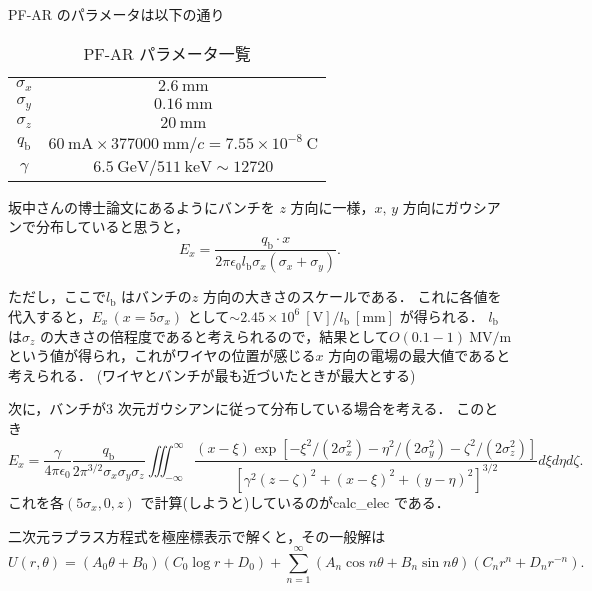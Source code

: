 \documentclass{jsarticle}
\begin{document}
PF-AR のパラメータは以下の通り
\begin{table}[h]
\centering
\caption{PF-AR パラメータ一覧\label{tab:pfarparameter}}
\begin{tabular}{cc} \hline
$\sigma_x$ & $2.6~\mathrm{mm}$ \\ 
$\sigma_y$ & $0.16~\mathrm{mm}$ \\ 
$\sigma_z$ & $20~\mathrm{mm}$ \\ 
$q_\mathrm{b}$ & $60~\mathrm{mA} \times 377000~\mathrm{mm}/c = 7.55 \times 10^{-8}~\mathrm{C}$ \\
$\gamma$ & $6.5~\mathrm{GeV}/511~\mathrm{keV} \sim 12720$ \\ \hline
\end{tabular}
\end{table}

坂中さんの博士論文にあるようにバンチを $z$ 方向に一様，$x,\,y$ 方向にガウシアンで分布していると思うと，
\begin{equation}
E_x = \frac{q_\mathrm{b} \cdot x}{2\pi \epsilon_0 l_\mathrm{b}\sigma_x(\sigma_x + \sigma_y)}.
\end{equation}

ただし，ここで$l_\mathrm{b}$ はバンチの$z$ 方向の大きさのスケールである．
これに各値を代入すると，$E_x\,(x = 5\sigma_x)$ として$\sim 2.45 \times 10^6~[\mathrm{V}] /l_\mathrm{b}~[\mathrm{mm}]$ が得られる．
$l_\mathrm{b}$ は$\sigma_z$ の大きさの倍程度であると考えられるので，結果として$O(0.1-1)~\mathrm{MV/m}$ という値が得られ，これがワイヤの位置が感じる$x$ 方向の電場の最大値であると考えられる．
(ワイヤとバンチが最も近づいたときが最大とする)

次に，バンチが3 次元ガウシアンに従って分布している場合を考える．
このとき
\begin{equation}
E_x = \frac{\gamma}{4\pi\epsilon_0}\frac{q_\mathrm{b}}{2\pi^{3/2}\sigma_x\sigma_y\sigma_z}\iiint_{-\infty}^\infty\frac{(x - \xi)\exp[-\xi^2/(2\sigma_x^2)-\eta^2/(2\sigma_y^2)-\zeta^2/(2\sigma_z^2)]}{[\gamma^2(z-\zeta)^2 + (x - \xi)^2 + (y - \eta)^2]^{3/2}}d\xi d\eta d\zeta.
\end{equation}
これを各$(5\sigma_x, 0, z)$ で計算(しようと)しているのがcalc\_elec である．

\newpage

二次元ラプラス方程式を極座標表示で解くと，その一般解は
\begin{equation}
U(r, \theta) = (A_0\theta + B_0)(C_0\log r + D_0)  + \sum_{n = 1}^\infty (A_n\cos n\theta + B_n\sin n\theta)(C_n r^n + D_n r^{-n}).
\end{equation}
\end{document}
